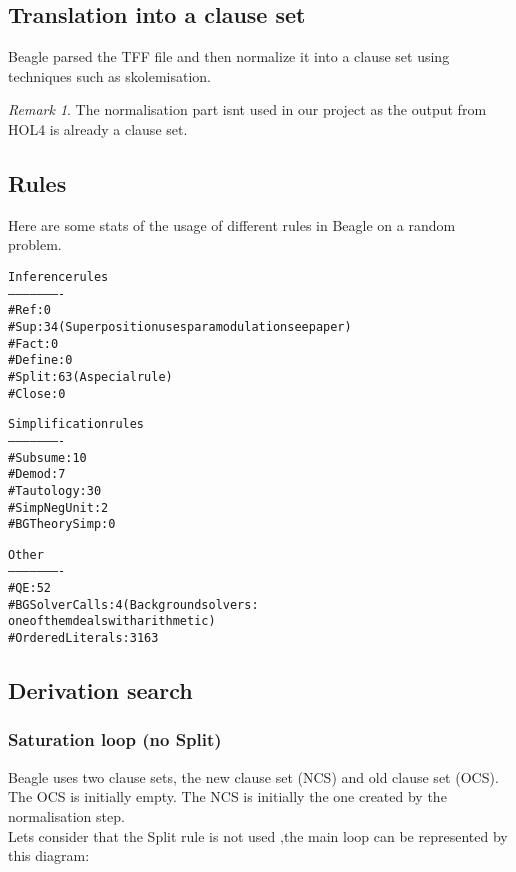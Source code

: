 \documentclass[a4paper, 11pt]{article}
\theoremstyle{plain}
\theoremstyle{definition}
\theoremstyle{remark}
\newtheorem*{remark}{Remark}
\begin{document}
\subsection{Translation into a clause set}
Beagle parsed the TFF file and then normalize it into a clause set using techniques such as skolemisation.
\begin{remark} The normalisation part isnt used in our project as the output from HOL4 is already a clause set.
\end{remark}  
  
\subsection{Rules}
Here are some stats of the usage of different rules in Beagle on a random problem.
\begin{alltt}
Inference rules
----------------------
#Ref:            0
#Sup:            34 (Superposition uses paramodulation see paper)
#Fact:           0
#Define:         0
#Split:          63 (A special rule)
#Close:          0

Simplification rules
----------------------
#Subsume:        10
#Demod:          7
#Tautology:      30
#SimpNegUnit:    2
#BGTheorySimp:   0

Other
----------------------
#QE:               52
#BGSolverCalls:    4 (Background solvers: 
                      one of them deals with arithmetic) 
#Ordered Literals: 3163
\end{alltt}

\subsection{Derivation search}
\subsubsection{Saturation loop (no Split)} 
Beagle uses two clause sets, the new clause set (NCS) and old clause set (OCS). The OCS is initially empty. The NCS is initially the one created by the normalisation step.
\\Lets consider that the Split rule is not used ,the main loop can be represented by this diagram:
  
  
\end{document}
